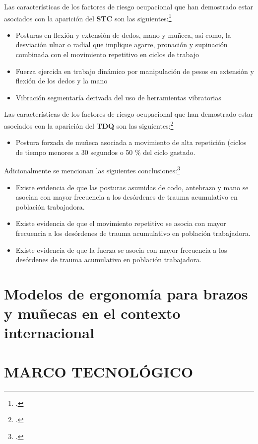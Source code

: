 Las características de los factores de riesgo ocupacional que han demostrado estar asociados con la aparición del \textbf{STC} son las siguientes:\footcite[45]{MinisterioCONTINUA}
\begin{itemize}
\item Posturas en flexión y extensión de dedos, mano y muñeca, así como, la desviación ulnar o radial que implique agarre, pronación y supinación combinada con el movimiento repetitivo en ciclos de trabajo
\item Fuerza ejercida en trabajo dinámico por manipulación de pesos en extensión y flexión de los dedos y la mano
\item Vibración segmentaría derivada del uso de herramientas vibratorias
\end{itemize}
Las características de los factores de riesgo ocupacional que han demostrado estar asociados con la aparición del \textbf{TDQ} son las siguientes:\footcite[45]{MinisterioCONTINUA}
\begin{itemize}
\item Postura forzada de muñeca asociada a movimiento de alta repetición (ciclos de tiempo menores a 30 segundos o 50 \% del ciclo gastado.
\end{itemize}
Adicionalmente se mencionan las siguientes conclusiones:\footcite[46]{MinisterioCONTINUA}
\begin{itemize}
\item Existe evidencia de que las posturas asumidas de codo, antebrazo y mano se asocian con mayor frecuencia a los desórdenes de trauma acumulativo en población trabajadora.
\item Existe evidencia de que el movimiento repetitivo se asocia con mayor frecuencia a los desórdenes de trauma acumulativo en población trabajadora.
\item Existe evidencia de que la fuerza se asocia con mayor frecuencia a los desórdenes de trauma acumulativo en población trabajadora.
\end{itemize}



\section{Modelos de ergonomía para brazos y muñecas en el contexto internacional}
\subsubsection{}
\section{MARCO TECNOLÓGICO}